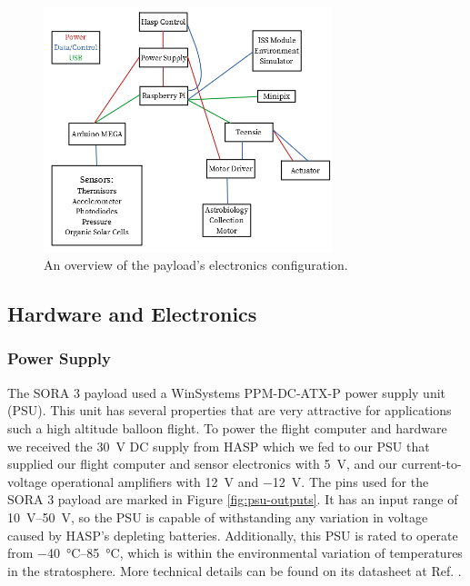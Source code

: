 \begin{figure}[h!]
	\begin{center}
		\includegraphics[width=0.75\textwidth]{figures/sys_overview.png}
		\caption{An overview of the payload's electronics configuration.}
		\label{fig:sys_overview}
	\end{center}
\end{figure}

\subsection{Hardware and Electronics}
\subsubsection{Power Supply}

The SORA 3 payload used a WinSystems PPM-DC-ATX-P power supply unit (PSU).
This unit has several properties that are very attractive for applications such a high altitude balloon flight. 
To power the flight computer and hardware we received the \SI{30}{\volt} DC supply from HASP which we fed to our PSU that supplied our flight computer and sensor electronics with \SI{+5}{\volt}, and our current-to-voltage operational amplifiers with \SI{+12}{\volt} and \SI{-12}{\volt}.
The pins used for the SORA 3 payload are marked in Figure \ref{fig:psu-outputs}.
It has an input range of \SIrange{10}{50}{\volt}, so the PSU is capable of withstanding any variation in voltage caused by HASP's depleting batteries.
Additionally, this PSU is rated to operate from \SIrange{-40}{85}{\celsius}, which is within the environmental variation of temperatures in the stratosphere.
More technical details can be found on its datasheet at Ref. \cite{WinSystems-PSU}.

